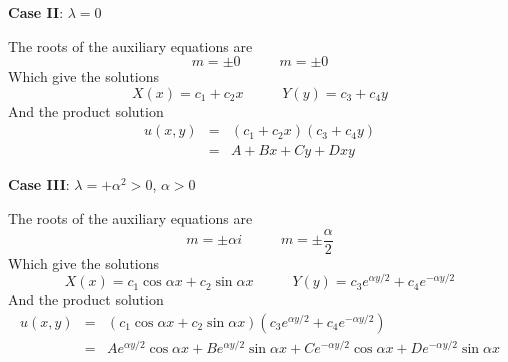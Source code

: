 \documentclass[11pt]{article}
\begin{document}
\textbf{Case II}: $\lambda = 0$

The roots of the auxiliary equations are
\begin{equation*}
m = \pm 0 \;\;\;\;\;\;\;\;\;\; m = \pm 0
\end{equation*}
Which give the solutions
\begin{equation*}
X(x) = c_1 + c_2 x \;\;\;\;\;\;\;\;\;\; Y(y) = c_3 + c_4 y
\end{equation*}
And the product solution
\begin{eqnarray*}
u(x,y) &=& \left( c_1 + c_2 x \right) \left( c_3 + c_4 y \right) \\
	&=& A + B x + C y + D xy
\end{eqnarray*}

\textbf{Case III}: $\lambda = +\alpha^2 > 0$, $\alpha > 0$

The roots of the auxiliary equations are
\begin{equation*}
m = \pm \alpha i \;\;\;\;\;\;\;\;\;\; m = \pm \frac{\alpha}{2}
\end{equation*}
Which give the solutions
\begin{equation*}
X(x) = c_1 \cos \alpha x + c_2 \sin \alpha x \;\;\;\;\;\;\;\;\;\; Y(y) = c_3 e^{\alpha y / 2} + c_4 e^{- \alpha y / 2}
\end{equation*}
And the product solution
\begin{eqnarray*}
u(x,y) &=& \left( c_1 \cos \alpha x + c_2 \sin \alpha x \right) \left( c_3 e^{\alpha y / 2} + c_4 e^{- \alpha y / 2} \right) \\
	&=& A e^{\alpha y / 2} \cos \alpha x + B e^{\alpha y / 2} \sin \alpha x + C e^{- \alpha y / 2} \cos \alpha x + D e^{- \alpha y / 2} \sin \alpha x
\end{eqnarray*}
\end{document}
